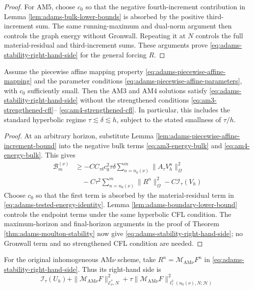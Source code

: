 \documentclass[11pt]{article}
\begin{document}
\begin{proof}
For AM5, choose \(c_0\) so that the negative fourth-increment contribution
in Lemma \ref{lem:adams-bulk-lower-bounds} is absorbed by the positive
third-increment sum. The same running-maximum and dual-norm argument then
controls the graph energy without Gronwall. Repeating it at \(N\) controls
the full material-residual and third-increment sums. These arguments prove
\eqref{eq:adams-stability-right-hand-side} for the general forcing \(R\).
\end{proof}

\begin{cor}
\label{cor:adams-piecewise-affine-stability}
Assume the piecewise affine mapping property
\eqref{eq:adams-piecewise-affine-mapping} and the parameter conditions
\eqref{eq:adams-piecewise-affine-parameters}, with \(c_0\) sufficiently
small. Then the AM3 and AM4 solutions satisfy
\eqref{eq:adams-stability-right-hand-side} without the strengthened
conditions \eqref{eq:am3-strengthened-cfl}--
\eqref{eq:am4-strengthened-cfl}. In particular, this includes the standard
hyperbolic regime \(\tau\lesssim\delta\lesssim h\), subject to the stated
smallness of \(\tau/h\).
\end{cor}
\begin{proof}
At an arbitrary horizon, substitute Lemma
\ref{lem:adams-piecewise-affine-increment-bound} into the negative bulk
terms \eqref{eq:am3-energy-bulk} and \eqref{eq:am4-energy-bulk}. This gives
\begin{align}
\mathcal B_m^{(\nu)}
&\ge-C C_{\tau\delta}c_0^2\tau\delta
\sum_{n=n_0(\nu)}^m\|A_{\tau}V_h^n\|_{\Omega}^2
\label{eq:adams-piecewise-affine-bulk-lower-bound-solution}\\
&\quad-C\tau^2\sum_{n=n_0(\nu)}^m\|R^n\|_{\Omega}^2
-C\mathcal I_{\tau}(V_h)
\label{eq:adams-piecewise-affine-bulk-lower-bound-forcing}
\end{align}
Choose \(c_0\) so that the first term is absorbed by the material-residual
term in \eqref{eq:adams-tested-energy-identity}. Lemma
\ref{lem:adams-boundary-lower-bound} controls the endpoint terms under the
same hyperbolic CFL condition. The maximum-horizon and final-horizon
arguments in the proof of Theorem \ref{thm:adams-moulton-stability} now give
\eqref{eq:adams-stability-right-hand-side}; no Gronwall term and no
strengthened CFL condition are needed.
\end{proof}

For the original inhomogeneous AM\(\nu\) scheme, take
\(R^n=\mathcal M_{\mathrm{AM}\nu}F^n\) in
\eqref{eq:adams-stability-right-hand-side}. Thus its right-hand side is
\begin{equation}
\mathcal I_{\tau}(U_h)
+\|\mathcal M_{\mathrm{AM}\nu}F\|_{\mathcal E_\nu^*,N}^2
+\tau\|\mathcal M_{\mathrm{AM}\nu}F\|_{
\ell_{\tau}^2(n_0(\nu),N;\mathcal H)}^2
\label{eq:adams-physical-stability-right-hand-side}
\end{equation}
\end{document}
